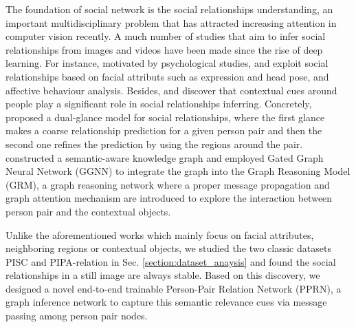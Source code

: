 \documentclass{article}
\newcommand{\PPRN}{{\sf PPRN}}
\begin{document}
The foundation of social network is the social relationships understanding, an important multidisciplinary problem that has attracted increasing attention in computer vision recently. A much number of studies that aim to infer social relationships from images \cite{DBLP:conf/iccv/LiWZK17,DBLP:conf/ijcai/WangCRYCL18,DBLP:conf/eccv/WangGLF10,DBLP:conf/iccv/ZhangLLT15} and videos \cite{DBLP:conf/eccv/DingY10,DBLP:conf/cvpr/RamanathanY013,DBLP:journals/ivc/VinciarelliPB09} have been made since the rise of deep learning. For instance, motivated by psychological studies, \cite{DBLP:conf/iccv/ZhangLLT15} and \cite{DBLP:conf/iccv/DibekliogluSG13} exploit social relationships based on facial attributs such as expression and head pose, and affective behaviour analysis. Besides, \cite{DBLP:conf/iccv/LiWZK17} and \cite{DBLP:conf/ijcai/WangCRYCL18} discover that contextual cues around people play a significant role in social relationships inferring. Concretely, \cite{DBLP:conf/iccv/LiWZK17} proposed a dual-glance model for social relationships, where the first glance makes a coarse relationship prediction for a given person pair and then the second one refines the prediction by using the regions around the pair. \cite{DBLP:conf/ijcai/WangCRYCL18} constructed a semantic-aware knowledge graph and employed Gated Graph Neural Network (GGNN) \cite{DBLP:journals/tomccap/LiSKJZW15} to integrate the graph into the Graph Reasoning Model (GRM), a graph reasoning network where a proper message propagation and graph attention mechanism are introduced to explore the interaction between person pair and the contextual objects.

Unlike the aforementioned works which mainly focus on facial attributes, neighboring regions or contextual objects, we studied the two classic datasets PISC \cite{DBLP:conf/iccv/LiWZK17} and PIPA-relation \cite{DBLP:conf/cvpr/SunSF17} in Sec. \ref{section:dataset_anaysis} and found the social relationships in a still image are always stable. Based on this discovery, we designed a novel end-to-end trainable Person-Pair Relation Network (\PPRN), a graph inference network to capture this semantic relevance cues via message passing among person pair nodes.
\end{document}
